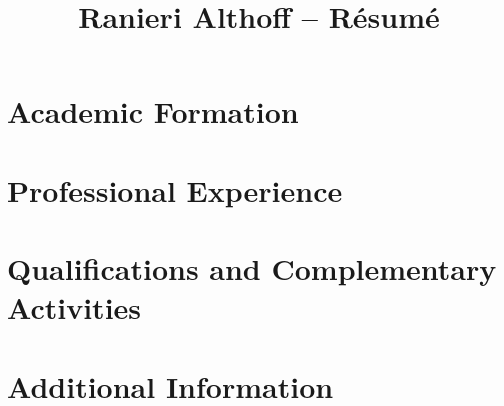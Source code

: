 \documentclass[10pt]{article}
\begin{document}
\title{Ranieri Althoff -- Résumé}

\section{Academic Formation}


\section{Professional Experience}


\section{Qualifications and Complementary Activities}


\section{Additional Information}
\end{document}
